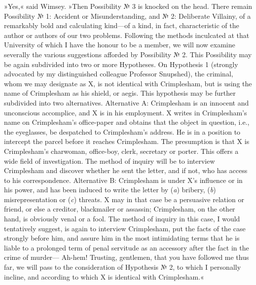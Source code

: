 »Yes,« said Wimsey. »Then Possibility № 3 is knocked on the head. There remain Possibility № 1: Accident or Misunderstanding, and № 2: Deliberate Villainy, of a remarkably bold and calculating kind—of a kind, in fact, characteristic of the author or authors of our two problems. Following the methods inculcated at that University of which I have the honour to be a member, we will now examine severally the various suggestions afforded by Possibility № 2. This Possibility may be again subdivided into two or more Hypotheses. On Hypothesis 1 (strongly advocated by my distinguished colleague Professor Snupshed), the criminal, whom we may designate as X, is not identical with Crimplesham, but is using the name of Crimplesham as his shield, or aegis. This hypothesis may be further subdivided into two alternatives. Alternative A: Crimplesham is an innocent and unconscious accomplice, and X is in his employment. X writes in Crimplesham's name on Crimplesham's office-paper and obtains that the object in question, i.e., the eyeglasses, be despatched to Crimplesham's address. He is in a position to intercept the parcel before it reaches Crimplesham. The presumption is that X is Crimplesham's charwoman, office-boy, clerk, secretary or porter. This offers a wide field of investigation. The method of inquiry will be to interview Crimplesham and discover whether he sent the letter, and if not, who has access to his correspondence. Alternative B: Crimplesham is under X's influence or in his power, and has been induced to write the letter by (\textit{a}) bribery, (\textit{b}) misrepresentation or (\textit{c}) threats. X may in that case be a persuasive relation or friend, or else a creditor, blackmailer or assassin; Crimplesham, on the other hand, is obviously venal or a fool. The method of inquiry in this case, I would tentatively suggest, is again to interview Crimplesham, put the facts of the case strongly before him, and assure him in the most intimidating terms that he is liable to a prolonged term of penal servitude as an accessory after the fact in the crime of murder--- Ah-hem! Trusting, gentlemen, that you have followed me thus far, we will pass to the consideration of Hypothesis № 2, to which I personally incline, and according to which X is identical with Crimplesham.«

